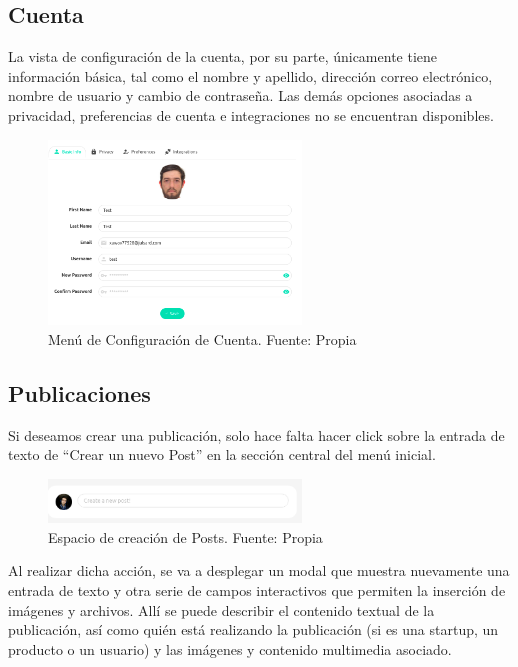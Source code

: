 \subsection{Cuenta}

La vista de configuración de la cuenta, por su parte, únicamente tiene información básica, tal como el nombre y apellido, dirección correo electrónico, nombre de usuario y cambio de contraseña. Las demás opciones asociadas a privacidad, preferencias de cuenta e integraciones no se encuentran disponibles.

\begin{figure}[H]
\centering
\includegraphics[width=0.60\textwidth]{img/32.png}
\caption{Menú de Configuración de Cuenta. Fuente: Propia}
\label{figure:accountMenu}
\end{figure}

\subsection{Publicaciones}

Si deseamos crear una publicación, solo hace falta hacer click sobre la entrada de texto de “Crear un nuevo Post” en la sección central del menú inicial.

\begin{figure}[H]
\centering
\includegraphics[width=0.60\textwidth]{img/33.png}
\caption{Espacio de creación de Posts. Fuente: Propia}
\label{figure:postsCreation}
\end{figure}


Al realizar dicha acción, se va a desplegar un modal que muestra nuevamente una entrada de texto y otra serie de campos interactivos que permiten la inserción de imágenes y archivos. Allí se puede describir el contenido textual de la publicación, así como quién está realizando la publicación (si es una startup, un producto o un usuario) y las imágenes y contenido multimedia asociado.


